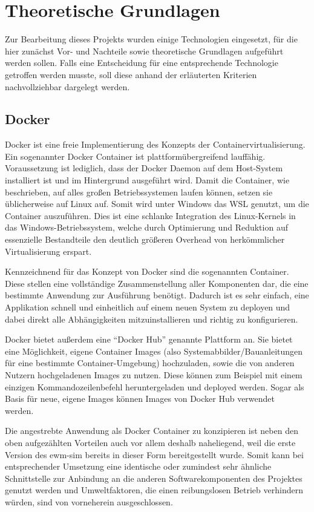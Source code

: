 \chapter{Theoretische Grundlagen}
Zur Bearbeitung dieses Projekts wurden einige Technologien eingesetzt, für die hier zunächst Vor- und Nachteile sowie theoretische Grundlagen aufgeführt werden sollen.
Falls eine Entscheidung für eine entsprechende Technologie getroffen werden musste, soll diese anhand der erläuterten Kriterien nachvollziehbar dargelegt werden.

\section{Docker}
\label{docker}
Docker ist eine freie Implementierung des Konzepts der Containervirtualisierung.
Ein sogenannter Docker Container ist plattformübergreifend lauffähig.
Voraussetzung ist lediglich, dass der Docker Daemon auf dem Host-System installiert ist und im Hintergrund ausgeführt wird.
Damit die Container, wie beschrieben, auf alles großen Betriebssystemen laufen können, setzen sie üblicherweise auf Linux auf.
Somit wird unter Windows das \ac{WSL} genutzt, um die Container auszuführen.
Dies ist eine schlanke Integration des Linux-Kernels in das Windows-Betriebssystem, welche durch Optimierung und Reduktion auf essenzielle Bestandteile den deutlich größeren Overhead von herkömmlicher Virtualisierung erspart.~\cite{wsl}

Kennzeichnend für das Konzept von Docker sind die sogenannten Container.
Diese stellen eine vollständige Zusammenstellung aller Komponenten dar, die eine bestimmte Anwendung zur Ausführung benötigt.
Dadurch ist es sehr einfach, eine Applikation schnell und einheitlich auf einem neuen System zu deployen und dabei direkt alle Abhängigkeiten mitzuinstallieren und richtig zu konfigurieren.~\cite{whatisacontainer}

Docker bietet außerdem eine \enquote{Docker Hub} genannte Plattform an.
Sie bietet eine Möglichkeit, eigene Container Images (also Systemabbilder/Bauanleitungen für eine bestimmte Container-Umgebung) hochzuladen, sowie die von anderen Nutzern hochgeladenen Images zu nutzen.
Diese können zum Beispiel mit einem einzigen Kommandozeilenbefehl heruntergeladen und deployed werden. Sogar als Basis für neue, eigene Images können Images von Docker Hub verwendet werden.~\cite{dockerhub}

Die angestrebte Anwendung als Docker Container zu konzipieren ist neben den oben aufgezählten Vorteilen auch vor allem deshalb naheliegend, weil die erste Version des \ac{ewm-sim} bereits in dieser Form bereitgestellt wurde.
Somit kann bei entsprechender Umsetzung eine identische oder zumindest sehr ähnliche Schnittstelle zur Anbindung an die anderen Softwarekomponenten des Projektes genutzt werden und Umweltfaktoren, die einen reibungslosen Betrieb verhindern würden, sind von vorneherein ausgeschlossen.

